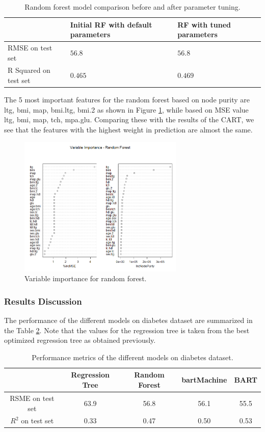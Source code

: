 \documentclass{usiinftr}
\begin{document}
\begin{table}
\centering \label{RFtuned} \caption{Random forest model comparison before and after parameter tuning.}
\begin{tabular}{|l|l|l|}
\hline & Initial RF with default parameters & RF with tuned parameters \\
\hline RMSE on test set & $56.8$ & $56.8$ \\
\hline R Squared on test set & $0.465$ & $0.469$ \\
\hline
\end{tabular}
\end{table}

The 5 most important features for the random forest based on node purity are ltg, bmi, map, bmi.ltg, bmi.2 as shown in Figure \ref{RFImp}, while based on MSE value ltg, bmi, map, tch, mpa.glu. Comparing these with the results of the CART, we see that the features with the highest weight in prediction are almost the same. 

\begin{figure}[h!] 
\centering
\includegraphics[width=0.7\textwidth]{images/image115.png}
\caption{Variable importance for random forest.}
\label{RFImp}
\end{figure}

\subsubsection{Results Discussion}
The performance of the different models on diabetes dataset are summarized in the Table \ref{result_diabetes}. Note that the values for the regression tree is taken from the best optimized regression tree as obtained previously. 

\begin{table} 
\centering \caption{Performance metrics of the different models on diabetes dataset.}
\begin{tabular}{|c|c|c|c|c|} 
\hline &  Regression Tree & Random Forest & bartMachine & BART \\
\hline RSME on test set & 63.9 & 56.8 & 56.1  & 55.5 \\
\hline $R^2$ on test set & 0.33 & 0.47 & 0.50  & 0.53\\
\hline
\end{tabular}
\label{result_diabetes}
\end{table}
\end{document}
